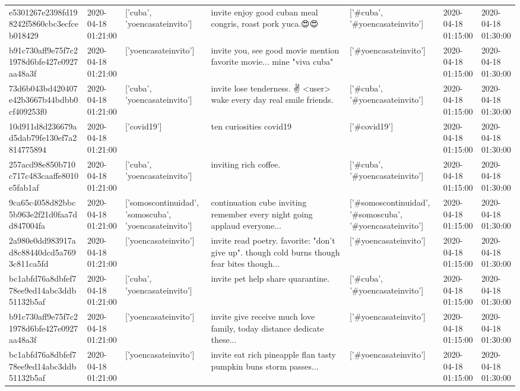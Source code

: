\begin{tabular}{lllllll}
e5301267e2398fd198242f5860cbc3ecfceb018429 & 2020-04-18 01:21:00 & ['cuba', 'yoencasateinvito'] & invite enjoy good cuban meal congris, roast pork yuca.😍😍 & ['#cuba', '#yoencasateinvito'] & 2020-04-18 01:15:00 & 2020-04-18 01:30:00 \\
b91c730aff9e75f7c21978d6bfe427e0927aa48a3f & 2020-04-18 01:21:00 & ['yoencasateinvito'] & invite you, see good movie mention favorite movie... mine "viva cuba" & ['#yoencasateinvito'] & 2020-04-18 01:15:00 & 2020-04-18 01:30:00 \\
73d6b043bd420407e42b3667b44bdbb0cf409253f0 & 2020-04-18 01:21:00 & ['cuba', 'yoencasateinvito'] & invite lose tenderness. ✌️ <user> wake every day real smile friends. & ['#cuba', '#yoencasateinvito'] & 2020-04-18 01:15:00 & 2020-04-18 01:30:00 \\
10d911d8d236679ad5dab79fe130ef7a2814775894 & 2020-04-18 01:21:00 & ['covid19'] & ten curiosities covid19 & ['#covid19'] & 2020-04-18 01:15:00 & 2020-04-18 01:30:00 \\
257acd98e850b710c717c483caaffe8010e5fab1af & 2020-04-18 01:21:00 & ['cuba', 'yoencasateinvito'] & inviting rich coffee. & ['#cuba', '#yoencasateinvito'] & 2020-04-18 01:15:00 & 2020-04-18 01:30:00 \\
9ca65c4058d82bbc5b963e2f21d0faa7dd847004fa & 2020-04-18 01:21:00 & ['somoscontinuidad', 'somoscuba', 'yoencasateinvito'] & continuation cube inviting remember every night going applaud everyone... & ['#somoscontinuidad', '#somoscuba', '#yoencasateinvito'] & 2020-04-18 01:15:00 & 2020-04-18 01:30:00 \\
2a980e0dd983917ad8c88440dcd5a7693c811ca5fd & 2020-04-18 01:21:00 & ['yoencasateinvito'] & invite read poetry. favorite: "don't give up". though cold burns though fear bites though... & ['#yoencasateinvito'] & 2020-04-18 01:15:00 & 2020-04-18 01:30:00 \\
bc1abfd76a8dbfef778ee9ed14abc3ddb51132b5af & 2020-04-18 01:21:00 & ['cuba', 'yoencasateinvito'] & invite pet help share quarantine. & ['#cuba', '#yoencasateinvito'] & 2020-04-18 01:15:00 & 2020-04-18 01:30:00 \\
b91c730aff9e75f7c21978d6bfe427e0927aa48a3f & 2020-04-18 01:21:00 & ['yoencasateinvito'] & invite give receive much love family, today distance dedicate these... & ['#yoencasateinvito'] & 2020-04-18 01:15:00 & 2020-04-18 01:30:00 \\
bc1abfd76a8dbfef778ee9ed14abc3ddb51132b5af & 2020-04-18 01:21:00 & ['yoencasateinvito'] & invite eat rich pineapple flan tasty pumpkin buns storm passes... & ['#yoencasateinvito'] & 2020-04-18 01:15:00 & 2020-04-18 01:30:00 \\

\end{tabular}
